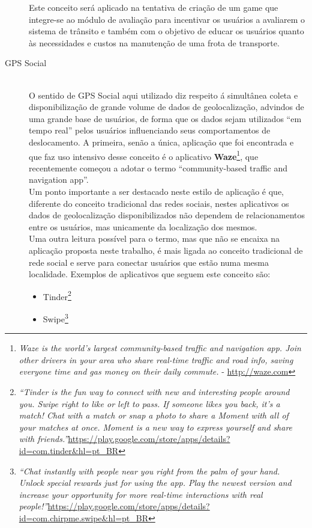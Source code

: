 \begin{description}
\begin{citacao}
	    \end{citacao}
	    Este conceito será aplicado na tentativa de criação de um game que integre-se ao módulo de avaliação para incentivar os usuários a avaliarem o sistema de trânsito e também com o objetivo de educar os usuários quanto às necessidades e custos na manutenção de uma frota de transporte.%
%
	\item[GPS Social] \hfill \\
	    O sentido de GPS Social aqui utilizado diz respeito á simultânea coleta e disponibilização de grande volume de dados de geolocalização, advindos de uma grande base de usuários, de forma que os dados sejam utilizados ``em tempo real'' pelos usuários influenciando seus comportamentos de deslocamento. A primeira, senão a única, aplicação que foi encontrada e que faz uso intensivo desse conceito é o aplicativo \textbf{Waze}\footnote{\textit{Waze is the world's largest community-based traffic and navigation app. Join other drivers in your area who share real-time traffic and road info, saving everyone time and gas money on their daily commute.} - \url{http://waze.com}}, que recentemente começou a adotar o termo ``community-based traffic and navigation app''.\\
	    Um ponto importante a ser destacado neste estilo de aplicação é que, diferente do conceito tradicional das redes sociais, nestes aplicativos os dados de geolocalização disponibilizados não dependem de relacionamentos entre os usuários, mas unicamente da localização dos mesmos. \\
	    Uma outra leitura possível para o termo, mas que não se encaixa na aplicação proposta neste trabalho, é mais ligada ao conceito tradicional de rede social e serve para conectar usuários que estão numa mesma localidade. Exemplos de aplicativos que seguem este conceito são:
	    \begin{itemize}
	    \item Tinder\footnote{\textit{``Tinder is the fun way to connect with new and interesting people around you. Swipe right to like or left to pass. If someone likes you back, it’s a match! Chat with a match or snap a photo to share a Moment with all of your matches at once. Moment is a new way to express yourself and share with friends.''}\url{https://play.google.com/store/apps/details?id=com.tinder&hl=pt_BR}}
	    \item Swipe\footnote{\textit{``Chat instantly with people near you right from the palm of your hand. Unlock special rewards just for using the app. Play the newest version and increase your opportunity for more real-time interactions with real people!''}\url{https://play.google.com/store/apps/details?id=com.chirpme.swipe&hl=pt_BR}}

\end{itemize}
\end{description}
